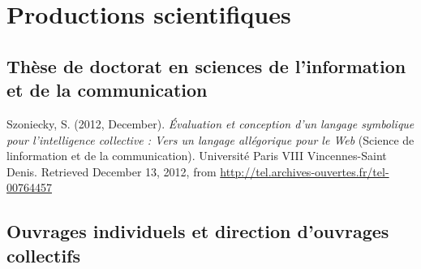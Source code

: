 \documentclass[
  a4paper,
  DIV=11,
  numbers=noendperiod]{scrreprt}
\newlength{\cslhangindent}
\newenvironment{CSLReferences}[2] %
 {\begin{list}{}{%
  \setlength{\itemindent}{0pt}
  \setlength{\leftmargin}{0pt}
  \setlength{\parsep}{0pt}
  \ifodd #1
   \setlength{\leftmargin}{\cslhangindent}
   \setlength{\itemindent}{-1\cslhangindent}
  \fi
  \setlength{\itemsep}{#2\baselineskip}}}
 {\end{list}}
\begin{document}
\section{Productions scientifiques}\label{productions-scientifiques}

\subsection{Thèse de doctorat en sciences de l'information et de la
communication}\label{sec-item299375}

\label{refs-these}
\begin{CSLReferences}{1}{0}
Szoniecky, S. (2012, December). \emph{Évaluation et conception d'un
langage symbolique pour l'intelligence collective : {Vers} un langage
allégorique pour le {Web}} (Science de l\textquotesingle information et
de la communication). Université Paris VIII Vincennes-Saint Denis.
Retrieved December 13, 2012, from
\url{http://tel.archives-ouvertes.fr/tel-00764457}

\end{CSLReferences}

\subsection{Ouvrages individuels et direction d'ouvrages
collectifs}\label{sec-item299376}
\end{document}
